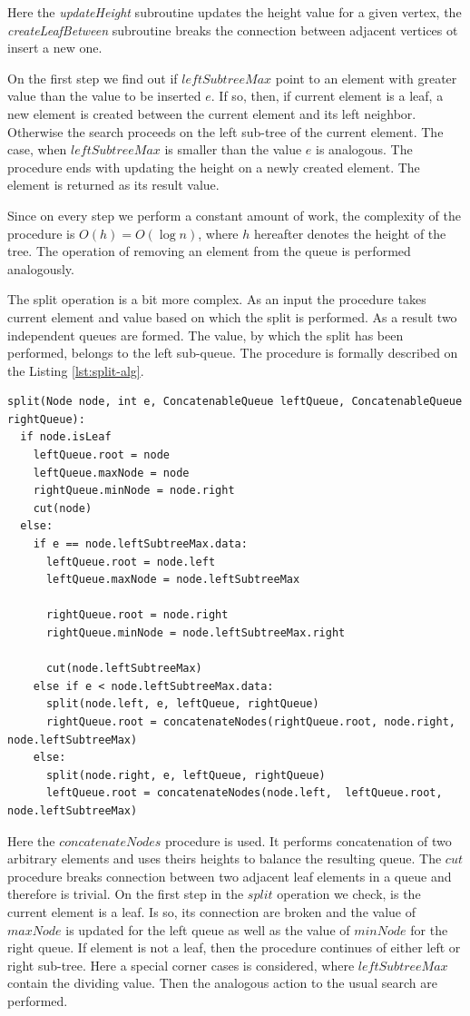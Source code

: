 \documentclass[conference]{IEEEtran}
\theoremstyle{plane}
\begin{document}
		Here the \textit{updateHeight} subroutine updates the height value for a given vertex, the \textit{createLeafBetween} subroutine breaks the connection between adjacent vertices ot insert a new one.
		
		On the first step we find out if $leftSubtreeMax$ point to an element with greater value than the value to be inserted $e$. If so, then, if current element is a leaf, a new element is created between the current element and its left neighbor. Otherwise the search proceeds on the left sub-tree of the current element. The case, when $leftSubtreeMax$ is smaller than the value $e$ is analogous. The procedure ends with updating the height on a newly created element. The element is returned as its result value.
		
		Since on every step we perform a constant amount of work, the complexity of the procedure is $O(h)=O(\log n)$, where $h$ hereafter denotes the height of the tree. The operation of removing an element from the queue is performed analogously. 
		
		The split operation is a bit more complex. As an input the procedure takes current element and value based on which the split is performed. As a result two independent queues are formed. The value, by which the split has been performed, belongs to the left sub-queue. The procedure is formally described on the Listing \ref{lst:split-alg}.
		
		\begin{lstlisting}[caption={Queue split algorithm},label={lst:split-alg},captionpos=b]
split(Node node, int e, ConcatenableQueue leftQueue, ConcatenableQueue rightQueue): 
  if node.isLeaf
    leftQueue.root = node
    leftQueue.maxNode = node	
    rightQueue.minNode = node.right	
    cut(node)
  else:
    if e == node.leftSubtreeMax.data:
      leftQueue.root = node.left
      leftQueue.maxNode = node.leftSubtreeMax
  	  
      rightQueue.root = node.right
      rightQueue.minNode = node.leftSubtreeMax.right
  	  
      cut(node.leftSubtreeMax)
    else if e < node.leftSubtreeMax.data:
      split(node.left, e, leftQueue, rightQueue)
      rightQueue.root = concatenateNodes(rightQueue.root, node.right, node.leftSubtreeMax)
    else:
      split(node.right, e, leftQueue, rightQueue)
      leftQueue.root = concatenateNodes(node.left,  leftQueue.root, node.leftSubtreeMax)
		\end{lstlisting}
		
		Here the $concatenateNodes$ procedure is used. It performs concatenation of two arbitrary elements and uses theirs heights to balance the resulting queue. The $cut$ procedure breaks connection between two adjacent leaf elements in a queue and therefore is trivial. On the first step in the $split$ operation we check, is the current element is a leaf. Is so, its connection are broken and the value of $maxNode$ is updated for the left queue as well as the value of $minNode$ for the right queue. If element is not a leaf, then the procedure continues of either left or right sub-tree. Here a special corner cases is considered, where $leftSubtreeMax$ contain the dividing value. Then the analogous action to the usual search are performed.
		
\end{document}
